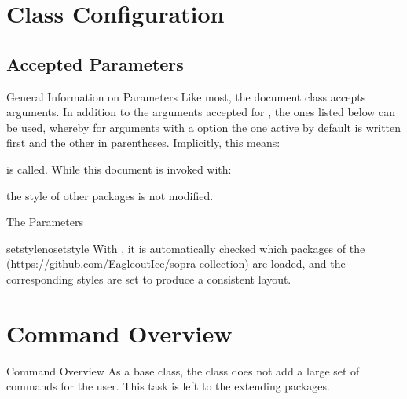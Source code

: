 \documentclass{sopra-seraphim}
\begin{document}
    \section{Class Configuration}
    \subsection{Accepted Parameters}
    \begin{frame}[fragile]{General Information on Parameters}
    Like most, the document class accepts arguments. In addition to
    the arguments accepted for , the ones listed below
    can be used, whereby for arguments with a  option
    the one active by default is written first and the other in parentheses.
    Implicitly, this means:
    is called. While this document is invoked with:
    the style of other  packages is not modified.
    \end{frame}

    \begin{frame}[fragile]{The Parameters}
        \begin{argument}{setstyle}{nosetstyle}
            With , it is automatically checked which packages of the  (\url{https://github.com/EagleoutIce/sopra-collection}) are loaded, and the corresponding styles are set to produce a consistent layout.
        \end{argument}
    \end{frame}


    \section{Command Overview}
    \begin{frame}{Command Overview}
        As a base class, the class does not add a large set of commands for
        the user. This task is left to the extending packages.
    \end{frame}
\end{document}
